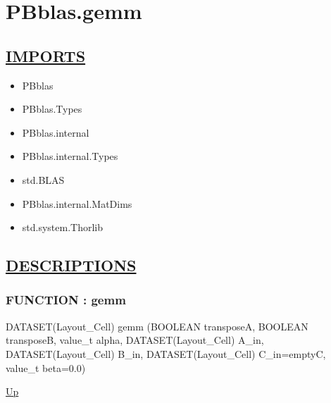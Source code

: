 \chapter*{PBblas.gemm}
\hypertarget{ecldoc:toc:PBblas.gemm}{}

\section*{\underline{IMPORTS}}
\begin{itemize}
\item PBblas
\item PBblas.Types
\item PBblas.internal
\item PBblas.internal.Types
\item std.BLAS
\item PBblas.internal.MatDims
\item std.system.Thorlib
\end{itemize}

\section*{\underline{DESCRIPTIONS}}
\subsection*{FUNCTION : gemm}
\hypertarget{ecldoc:pbblas.gemm}{}
\begin{minipage}[t]{\textwidth}
\begin{flushleft}
DATASET(Layout\_Cell) gemm (BOOLEAN transposeA, BOOLEAN transposeB, value\_t alpha, DATASET(Layout\_Cell) A\_in, DATASET(Layout\_Cell) B\_in, DATASET(Layout\_Cell) C\_in=emptyC, value\_t beta=0.0)
\end{flushleft}
\end{minipage}
\hyperlink{ecldoc:toc:PBblas}{Up}

